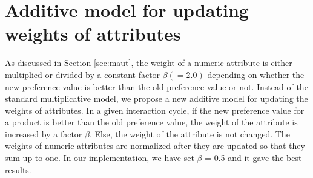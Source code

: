 \section{Additive model for updating weights of attributes}
\label{sec:additive}

As discussed in Section \ref{sec:maut}, the weight of a numeric attribute is either multiplied or divided by a constant factor $\beta (=2.0)$ depending on whether the new preference value is better than the old preference value or not.
Instead of the standard multiplicative model, we propose a new additive model for updating the weights of attributes.
In a given interaction cycle, if the new preference value for a product is better than the old preference value, the weight of the attribute is increased by a factor $\beta$.
Else, the weight of the attribute is not changed.
The weights of numeric attributes are normalized after they are updated so that they sum up to one. 
In our implementation, we have set $\beta$ = 0.5 and it gave the best results.
